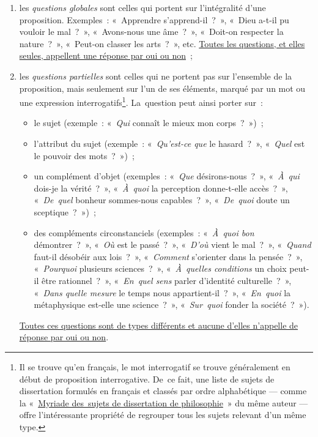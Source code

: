 \documentclass[a4paper,12pt]{report}
\begin{document}
\begin{enumerate}
\item les \emph{questions globales} sont celles qui portent sur l'intégralité
d'une proposition. Exemples : « Apprendre s’apprend-il ? », « Dieu
a-t-il pu vouloir le mal ? », « Avons-nous une âme ? », « Doit-on
respecter la nature ? », « Peut-on classer les arts ? », etc. \uline{Toutes
les questions, et elles seules, appellent une réponse par oui ou
non} ;

\item les \emph{questions partielles} sont celles qui ne portent pas sur
l'ensemble de la proposition, mais seulement sur l'un de ses
éléments, marqué par un mot ou une expression interrogatifs\footnote{Il se trouve qu'en français, le mot interrogatif se trouve
généralement en début de proposition interrogative. De ce fait, une
liste de sujets de dissertation formulés en français et classés par
ordre alphabétique — comme la « \href{http://baptiste.meles.free.fr/site/BMeles-Myriade\_sujets\_dissertation\_philosophie.pdf }{Myriade des sujets de dissertation de
philosophie} » du même auteur — offre l'intéressante propriété de
regrouper tous les sujets relevant d'un même type.}.
La question peut ainsi porter sur :
\begin{itemize}
\item le sujet (exemple : « \emph{Qui} connaît le mieux mon corps ? ») ;
\item l'attribut du sujet (exemple : « \emph{Qu'est-ce que} le hasard ? »,
« \emph{Quel} est le pouvoir des mots ? ») ;
\item un complément d'objet (exemples : « \emph{Que} désirons-nous ? »,
« \emph{À qui} dois-je la vérité ? », « \emph{À quoi} la perception
donne-t-elle accès ? », « \emph{De quel} bonheur sommes-nous
capables ? », « \emph{De quoi} doute un sceptique ? ») ;
\item des compléments circonstanciels (exemples : « \emph{À quoi bon}
démontrer ? », « \emph{Où} est le passé ? », « \emph{D'où} vient le mal ? »,
« \emph{Quand} faut-il désobéir aux lois ? », « \emph{Comment} s’orienter
dans la pensée ? », « \emph{Pourquoi} plusieurs sciences ? »,
« \emph{À quelles conditions} un choix peut-il être rationnel ? »,
« \emph{En quel sens} parler d'identité culturelle ? », « \emph{Dans quelle
mesure} le temps nous appartient-il ? », « \emph{En quoi} la
métaphysique est-elle une science ? », « \emph{Sur quoi} fonder la
société ? »).
\end{itemize}
\uline{Toutes ces questions sont de types différents et aucune d'elles
n'appelle de réponse par oui ou non}.
\end{enumerate}
\end{document}
